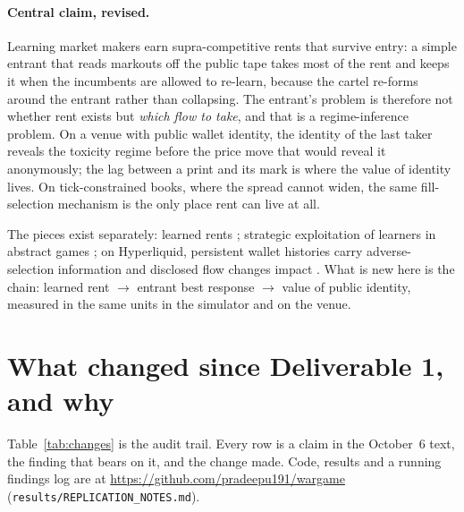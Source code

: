 \documentclass[11pt]{article}
\begin{document}
\paragraph{Central claim, revised.} Learning market makers earn supra-competitive rents that survive entry: a simple entrant that reads markouts off the public tape takes most of the rent and keeps it when the incumbents are allowed to re-learn, because the cartel re-forms around the entrant rather than collapsing. The entrant's problem is therefore not whether rent exists but \emph{which flow to take}, and that is a regime-inference problem. On a venue with public wallet identity, the identity of the last taker reveals the toxicity regime before the price move that would reveal it anonymously; the lag between a print and its mark is where the value of identity lives. On tick-constrained books, where the spread cannot widen, the same fill-selection mechanism is the only place rent can live at all.

The pieces exist separately: learned rents \cite{cfl,contxiong}; strategic exploitation of learners in abstract games \cite{dss,brownmackay}; on Hyperliquid, persistent wallet histories carry adverse-selection information \cite{zhai} and disclosed flow changes impact \cite{barone}. What is new here is the chain: learned rent $\to$ entrant best response $\to$ value of public identity, measured in the same units in the simulator and on the venue.

\section{What changed since Deliverable 1, and why}\label{sec:changes}
Table~\ref{tab:changes} is the audit trail. Every row is a claim in the October~6 text, the finding that bears on it, and the change made. Code, results and a running findings log are at \url{https://github.com/pradeepu191/wargame} (\texttt{results/REPLICATION\_NOTES.md}).
\end{document}
